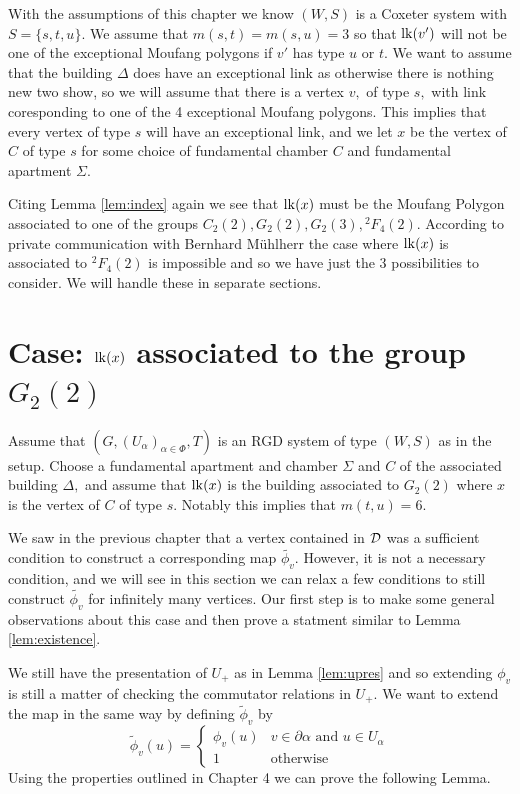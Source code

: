 \documentclass[class=book, crop=false]{standalone}
\begin{document}
With the assumptions of this chapter we know $(W,S)$ is a Coxeter system with $S=\{s,t,u\}.$ We assume that $m(s,t)=m(s,u)=3$ so that $\mathrm{lk}(v')$ will not be one of the exceptional Moufang polygons if $v'$ has type $u$ or $t.$ We want to assume that the building $\Delta$ does have an exceptional link as otherwise there is nothing new two show, so we will assume that there is a vertex $v,$ of type $s,$ with link coresponding to one of the 4 exceptional Moufang polygons. This implies that every vertex of type $s$ will have an exceptional link, and we let $x$ be the vertex of $C$ of type $s$ for some choice of fundamental chamber $C$ and fundamental apartment $\Sigma.$

Citing Lemma \ref{lem:index} again we see that $\mathrm{lk}(x)$ must be the Moufang Polygon associated to one of the groups $C_2(2),G_2(2),G_2(3),{}^2F_4(2).$ According to private communication with Bernhard M\"{u}hlherr the case where $\mathrm{lk}(x)$ is associated to ${}^2F_4(2)$ is impossible and so we have just the 3 possibilities to consider. We will handle these in separate sections.

\section{Case: $\mathrm{lk}(x)$ associated to the group $G_2(2)$}
Assume that $(G,(U_\alpha)_{\alpha\in \Phi},T)$ is an RGD system of type $(W,S)$ as in the setup. Choose a fundamental apartment and chamber $\Sigma$ and $C$ of the associated building $\Delta,$ and assume that $\mathrm{lk}(x)$ is the building associated to $G_2(2)$ where $x$ is the vertex of $C$ of type $s.$ Notably this implies that $m(t,u)=6.$

We saw in the previous chapter that a vertex contained in $\mathcal{D}$ was a sufficient condition to construct a corresponding map $\tilde{\phi_v}.$ However, it is not a necessary condition, and we will see in this section we can relax a few conditions to still construct $\tilde{\phi_v}$ for infinitely many vertices. Our first step is to make some general observations about this case and then prove a statment similar to Lemma \ref{lem:existence}.

We still have the presentation of $U_+$ as in Lemma \ref{lem:upres} and so extending $\phi_v$ is still a matter of checking the commutator relations in $U_+.$ We want to extend the map in the same way by defining $\tilde{\phi}_v$ by
\[
	\tilde{\phi}_v(u)=\begin{cases}\phi_v(u)&v\in \partial\alpha\text{ and }u\in U_\alpha\\
	1&\text{otherwise}\end{cases}
\]
Using the properties outlined in Chapter 4 we can prove the following Lemma.
\end{document}
